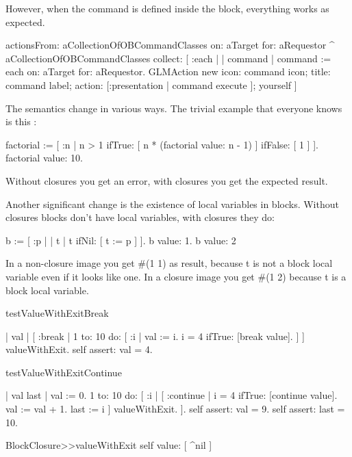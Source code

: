 \documentclass[a4paper,10pt,twoside]{book}
\begin{document}
However, when the command is defined inside the block, everything  
works as expected.

\begin{code}{}
actionsFrom: aCollectionOfOBCommandClasses on: aTarget for: aRequestor
	^ aCollectionOfOBCommandClasses collect: [ :each |
		| command |
		command := each on: aTarget for: aRequestor.
		GLMAction new
			icon: command icon;
			title: command label;
			action: [:presentation | command execute ];
			yourself
		]
	\end{code}




The semantics change in various ways. The trivial example that everyone 
knows is this :
\begin{code}{}
factorial := [ :n |
	n > 1
		ifTrue: [ n * (factorial value: n - 1) ]
		ifFalse: [ 1 ] ].
factorial value: 10.
\end{code}
Without closures you get an error, with closures you get the expected 
result. 

Another significant change is the existence of local variables in blocks. 
Without closures blocks don't have local variables, with closures they do: 

\begin{code}{}
b := [ :p |
	| t |
	t ifNil: [ t := p ] ].
{ b value: 1. b value: 2 }
\end{code}

In a non-closure image you get \#(1 1) as result, because t is not a block 
local variable even if it looks like one. In a closure image you get \#(1 2)
because t is a block local variable. 

\begin{code}{}
testValueWithExitBreak

	| val |	
	[ :break |
	    1 to: 10 do: [ :i |
			val := i.
			i = 4 ifTrue: [break value].
		] 
	] valueWithExit.
	self assert: val = 4.



testValueWithExitContinue

	| val last |	
	val := 0. 
	1 to: 10 do: [ :i |
		[ :continue |
			i = 4 ifTrue: [continue value].
			val := val + 1.
			last := i
		] valueWithExit.
	].
	self assert: val = 9.
	self assert: last = 10.	

BlockClosure>>valueWithExit 
	  self value: [ ^nil ]
\end{code}
\end{document}
